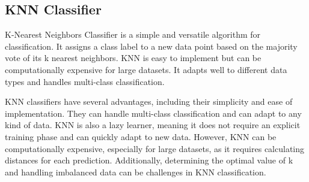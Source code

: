 \subsection{KNN Classifier}

K-Nearest Neighbors Classifier is a simple and versatile algorithm for classification. It assigns a class label to a new data point based on the majority vote of its k nearest neighbors\cite{AbuAlfeilat}. KNN is easy to implement but can be computationally expensive for large datasets. It adapts well to different data types and handles multi-class classification\cite{Tsoumakas}.

KNN classifiers have several advantages, including their simplicity and ease of implementation. They can handle multi-class classification and can adapt to any kind of data. KNN is also a lazy learner, meaning it does not require an explicit training phase and can quickly adapt to new data. However, KNN can be computationally expensive, especially for large datasets, as it requires calculating distances for each prediction. Additionally, determining the optimal value of k and handling imbalanced data can be challenges in KNN classification\cite{Syaliman}.